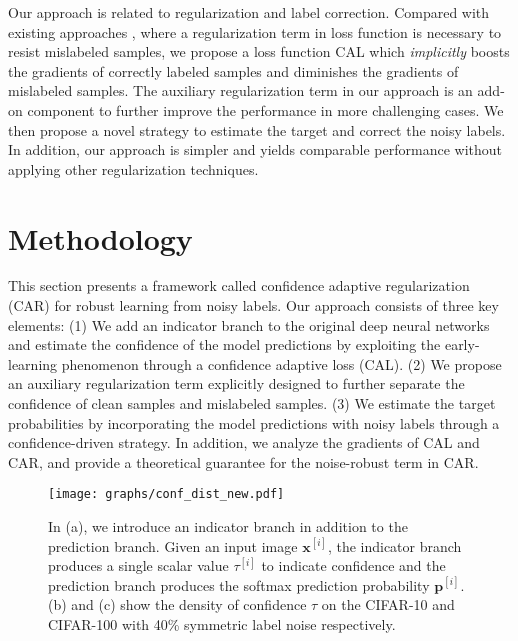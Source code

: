 \documentclass{article}
\begin{document}
Our approach is related to regularization and label correction. Compared with existing approaches \cite{hu2019simple,liu2020early}, where a regularization term in loss function is necessary to resist mislabeled samples, we propose a loss function CAL which \emph{implicitly} boosts the gradients of correctly labeled samples and diminishes the gradients of mislabeled samples. The auxiliary regularization term in our approach is an add-on component to further improve the performance in more challenging cases. We then propose a novel strategy to estimate the target and correct the noisy labels. In addition, our approach is simpler and yields comparable performance without applying other regularization techniques.
























 






\section{Methodology}
This section presents a framework called confidence adaptive regularization (CAR) for robust learning from noisy labels. Our approach consists of three key elements: (1) We add an indicator branch to the original deep neural networks and estimate the confidence of the model predictions by exploiting the early-learning phenomenon through a confidence adaptive loss (CAL). (2) We propose an auxiliary regularization term explicitly designed to further separate the confidence of clean samples and mislabeled samples. (3) We estimate the target probabilities by incorporating the model predictions with noisy labels through a confidence-driven strategy. In addition, we analyze the gradients of CAL and CAR, and provide a theoretical guarantee for the noise-robust term in CAR.

\begin{figure}[t]
	\begin{center}
		\texttt{[image: graphs/conf\_dist\_new.pdf]}
	\end{center}
	\caption{In (a), we introduce an indicator branch in addition to the prediction branch. Given an input image $\bm{x}^{[i]}$, the indicator branch produces a single scalar value $\tau^{[i]}$ to indicate confidence and the prediction branch produces the softmax prediction probability $\bm{p}^{[i]}$. (b) and (c) show the density of confidence $\tau$ on the CIFAR-10 and CIFAR-100 with 40\% symmetric label noise respectively.}
	\label{fig:framework}
	\vspace{-1em}
\end{figure}
\end{document}
